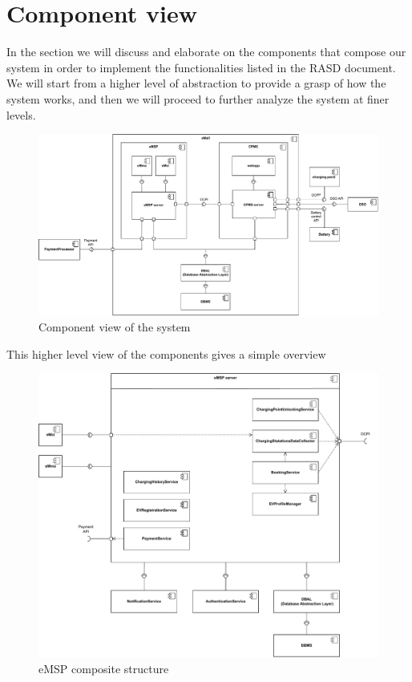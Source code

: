 \section{Component view}
In the section we will discuss and elaborate on the components that compose our system in order to implement the functionalities listed in the RASD document. We will start from a higher level of abstraction to provide a grasp of how the system works, and then we will proceed to further analyze the system at finer levels.
\begin{figure}[H]
    \centering
    \includegraphics[width=1\textwidth]{Images/cp2/component_overview.pdf}
    \caption{Component view of the system}
\end{figure}
This higher level view of the components gives a simple overview
\begin{figure}[H]
    \centering
    \includegraphics[width=1\textwidth]{Images/cp2/eMSP_server.pdf}
    \caption{eMSP composite structure}
\end{figure}

